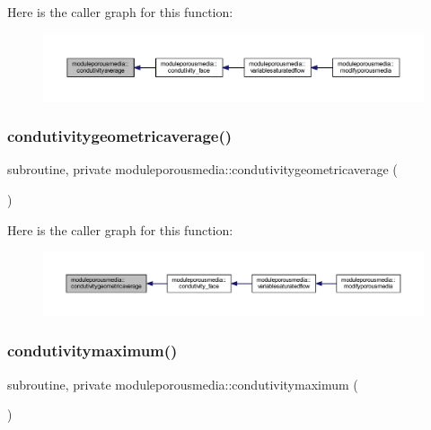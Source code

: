 Here is the caller graph for this function\+:\nopagebreak
\begin{figure}[H]
\begin{center}
\leavevmode
\includegraphics[width=350pt]{namespacemoduleporousmedia_af9319c9dde3c764e53801191ae902220_icgraph}
\end{center}
\end{figure}
\mbox{\label{namespacemoduleporousmedia_addae947f6fd1fa818093524bef8b0716}} 
\subsubsection{\texorpdfstring{condutivitygeometricaverage()}{condutivitygeometricaverage()}}
{\footnotesize\ttfamily subroutine, private moduleporousmedia\+::condutivitygeometricaverage (\begin{DoxyParamCaption}{ }\end{DoxyParamCaption})\hspace{0.3cm}{\ttfamily [private]}}

Here is the caller graph for this function\+:\nopagebreak
\begin{figure}[H]
\begin{center}
\leavevmode
\includegraphics[width=350pt]{namespacemoduleporousmedia_addae947f6fd1fa818093524bef8b0716_icgraph}
\end{center}
\end{figure}
\mbox{\label{namespacemoduleporousmedia_ae2e67be2f15dbdf148268d5b0fe82c68}} 
\subsubsection{\texorpdfstring{condutivitymaximum()}{condutivitymaximum()}}
{\footnotesize\ttfamily subroutine, private moduleporousmedia\+::condutivitymaximum (\begin{DoxyParamCaption}{ }\end{DoxyParamCaption})\hspace{0.3cm}{\ttfamily [private]}}

